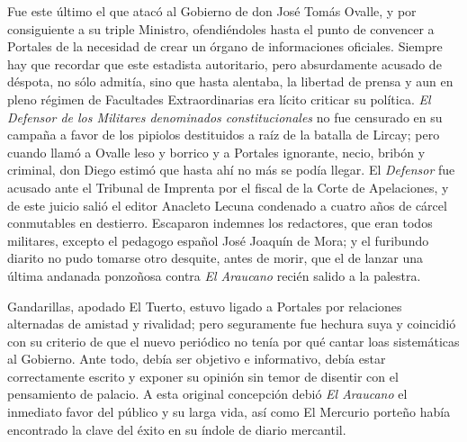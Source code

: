 \documentclass[10pt,twoside,openright]{memoir}
\begin{document}
Fue este último el que atacó al Gobierno de don José Tomás Ovalle, y por
consiguiente a su triple Ministro, ofendiéndoles hasta el punto de
convencer a Portales de la necesidad de crear un órgano de informaciones
oficiales. Siempre hay que recordar que este estadista autoritario, pero
absurdamente acusado de déspota, no sólo admitía, sino que hasta
alentaba, la libertad de prensa y aun en pleno régimen de Facultades
Extraordinarias era lícito criticar su política. \emph{El Defensor de los
Militares denominados constitucionales} no fue censurado en su campaña a
favor de los pipiolos destituidos a raíz de la batalla de Lircay; pero
cuando llamó a Ovalle leso y borrico y a Portales ignorante, necio,
bribón y criminal, don Diego estimó
que hasta ahí no más se podía llegar. El \emph{Defensor} fue acusado ante el
Tribunal de Imprenta por el fiscal de la Corte de Apelaciones, y de este
juicio salió el editor Anacleto Lecuna condenado a cuatro años de cárcel
conmutables en destierro. Escaparon indemnes los redactores, que eran
todos militares, excepto el pedagogo español José Joaquín de Mora; y el
furibundo diarito no pudo tomarse otro desquite, antes de morir, que el
de lanzar una última andanada ponzoñosa contra \emph{El Araucano} recién salido
a la palestra.

Gandarillas, apodado El Tuerto, estuvo ligado a Portales por relaciones alternadas de
amistad y rivalidad; pero seguramente fue hechura suya y coincidió con
su criterio de que el nuevo periódico no tenía por qué cantar loas
sistemáticas al Gobierno. Ante todo, debía ser objetivo e informativo,
debía estar correctamente escrito y
exponer su opinión sin temor de disentir con el pensamiento de palacio.
A esta original concepción debió \emph{El Araucano} el inmediato favor del
público y su larga vida, así como El Mercurio porteño había encontrado
la clave del éxito en su índole de diario mercantil.
\end{document}
